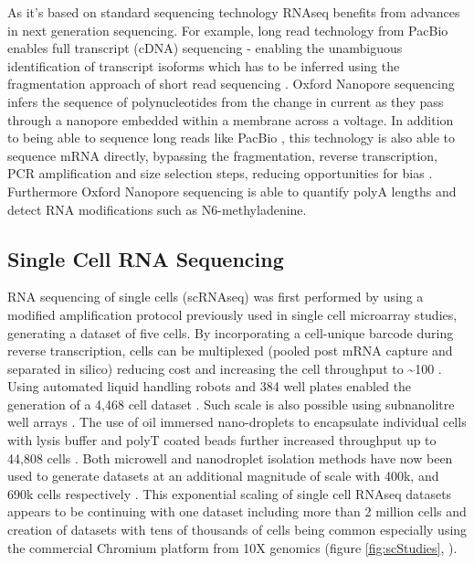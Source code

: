 As it's based on standard sequencing technology RNAseq benefits from advances in next generation sequencing. For example, long read technology from PacBio enables full transcript (cDNA) sequencing - enabling the unambiguous identification of transcript isoforms which has to be inferred using the fragmentation approach of short read sequencing \parencite{Sharon2013singlemolecule, Cartolano2016cDNA}.
Oxford Nanopore sequencing infers the sequence of polynucleotides from the change in current as they pass through a nanopore embedded within a membrane across a voltage. In addition to being able to sequence long reads like PacBio \parencite{Oikonomopoulos2016Benchmarking}, this technology is also able to sequence mRNA directly, bypassing the fragmentation, reverse transcription, PCR amplification and size selection steps, reducing opportunities for bias \parencite{Garalde2018Highly, Workman2019Nanopore}. Furthermore Oxford Nanopore sequencing is able to quantify polyA lengths and detect RNA modifications such as N6-methyladenine.

\subsection{Single Cell RNA Sequencing}
RNA sequencing of single cells (scRNAseq) was first performed by \cite{Tang2009mRNASeq} using a modified amplification protocol previously used in single cell microarray studies, generating a dataset of five cells. By incorporating a cell-unique barcode during reverse transcription, cells can be multiplexed (pooled post mRNA capture and separated in silico) reducing cost and increasing the cell throughput to \textasciitilde100 \parencite{Islam2012Highly}. Using automated liquid handling robots and 384 well plates enabled the generation of a 4,468 cell dataset \parencite{Jaitin2014Massively}. Such scale is also possible using subnanolitre well arrays \parencite{Bose2015Scalable, Fan2015Combinatorial, Gierahn2017SeqWell}. The use of oil immersed nano-droplets to encapsulate individual cells with lysis buffer and polyT coated beads further increased throughput up to 44,808 cells \parencite{Macosko2015Highly, Klein2015Droplet}. Both microwell and nanodroplet isolation methods have now been used to generate datasets at an additional magnitude of scale with 400k, and 690k cells respectively \parencite{Saunders2018Molecular, Han2018Mapping}. This exponential scaling of single cell RNAseq datasets appears to be continuing with one dataset including more than 2 million cells \parencite{Cao2019singlecell} and creation of datasets with tens of thousands of cells being common especially using the commercial Chromium platform from 10X genomics (figure \ref{fig:scStudies}, \cite{Zheng2017Massively, Svensson2018Exponential}).

